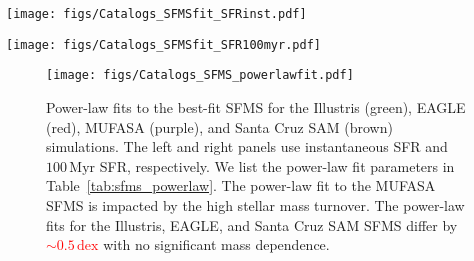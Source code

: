 \documentclass[preprint2,tighten]{aastex62}
\newcommand{\todo}[1]{{\bf \textcolor{red}{ #1}}}
\begin{document}
\begin{figure*}
\begin{center}
\texttt{[image: figs/Catalogs\_SFMSfit\_SFRinst.pdf]} 
\caption{Best-fit SFMS of the central galaxies in the Illustris, EAGLE, MUFASA, 
    and Santa Cruz SAM simulations as identified by our SFMS GMM fitting method 
    (Section~\ref{sec:sfmsfit}). The SFMSs above are fit from the instantaneous 
    SFR--$M_*$ relation. For reference, we include the best-fit SFMS of the SDSS 
    sample in the top right panel. The uncertainties of the best-fit SFMS are
    derived usig bootstrap resampling. When we compare the SFMS fits
    (bottom right panel), \emph{the SFMSs of the simulations have similar 
    overall stellar mass dependence, but their amplitude vary roughly by an 
    order of magnitude.}} \label{fig:sfmsfit_inst}
\end{center}
\end{figure*}

\begin{figure*}
\begin{center}
\texttt{[image: figs/Catalogs\_SFMSfit\_SFR100myr.pdf]} 
    \caption{Same as Figure~\ref{fig:sfmsfit_inst} but for the $100\,\mathrm{Myr}$ 
    SFR--$M_*$ relation. As in Figure~\ref{fig:sfmsfit_inst}, \emph{the SFMSs of the simulations have 
    similar stellar mass dependence but vary roughly by an order of magnitude in amplitude.}}
\label{fig:sfmsfit_100myr}
\end{center}
\end{figure*}

\begin{figure}
\begin{center}
\texttt{[image: figs/Catalogs\_SFMS\_powerlawfit.pdf]} 
\caption{Power-law fits to the best-fit SFMS for the Illustris (green), 
    EAGLE (red), MUFASA (purple), and Santa Cruz SAM (brown) simulations. 
    The left and right panels use instantaneous SFR and $100\,\mathrm{Myr}$ 
    SFR, respectively. We list the power-law fit parameters in 
    Table~\ref{tab:sfms_powerlaw}. The power-law fit to the MUFASA SFMS 
    is impacted by the high stellar mass turnover. The power-law fits for 
    the Illustris, EAGLE, and Santa Cruz SAM SFMS differ by \todo{${\sim}0.5\,\mathrm{dex}$}
    with no significant mass dependence.}
    \label{fig:sfmsfit_powerlaw}
\end{center}
\end{figure}
\end{document}
